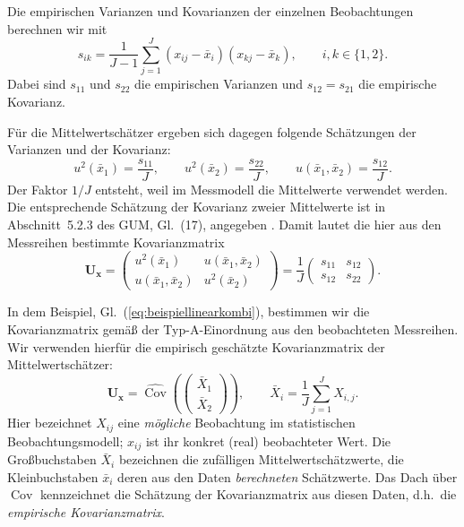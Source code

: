 Die empirischen Varianzen und Kovarianzen der einzelnen
Beobachtungen berechnen wir mit
\begin{equation}
s_{i k}
=
\frac{1}{J-1}
\sum_{j=1}^{J}
(x_{ij}-\bar x_i)(x_{kj}-\bar x_k),
\qquad i,k\in\{1,2\}.
\end{equation}
Dabei sind $s_{1 1}$ und $s_{2 2}$ die empirischen Varianzen
und $s_{1 2}=s_{2 1}$ die empirische Kovarianz.

Für die Mittelwertschätzer ergeben sich dagegen folgende
Schätzungen der Varianzen und der Kovarianz:
\begin{equation}
u^2(\bar x_1)=\frac{s_{1 1}}{J},
\qquad
u^2(\bar x_2)=\frac{s_{2 2}}{J},
\qquad
u(\bar x_1,\bar x_2)=\frac{s_{1 2}}{J}.
\end{equation}
Der Faktor $1/J$ entsteht, weil im Messmodell die Mittelwerte
verwendet werden.
Die entsprechende Schätzung der Kovarianz zweier Mittelwerte
ist in Abschnitt~5.2.3 des GUM, Gl.~(17), angegeben
\cite{GUM95}. Damit lautet die hier aus den Messreihen
bestimmte Kovarianzmatrix
\begin{equation}
\boxed{
\mathbf U_{\mathbf x}
=
\begin{pmatrix}
u^2(\bar x_1)&u(\bar x_1,\bar x_2)\\
u(\bar x_1,\bar x_2)&u^2(\bar x_2)
\end{pmatrix}
=
\frac{1}{J}
\begin{pmatrix}
s_{1 1}&s_{1 2}\\
s_{1 2}&s_{2 2}
\end{pmatrix}.
}
\end{equation}

In dem Beispiel, Gl.\ (\ref{eq:beispiellinearkombi}), bestimmen wir die Kovarianzmatrix
gemäß der Typ-A-Einordnung aus den beobachteten Messreihen.
Wir verwenden hierfür die empirisch geschätzte Kovarianzmatrix
der Mittelwertschätzer:
\begin{equation}
\mathbf U_{\mathbf x}
=
\widehat{\operatorname{Cov}}
\left(
\begin{pmatrix}
\bar X_1\\
\bar X_2
\end{pmatrix}
\right),
\qquad
\bar X_i=\frac{1}{J}\sum_{j=1}^{J}X_{i,j}.
\end{equation}
Hier bezeichnet $X_{i j}$ eine \emph{mögliche} Beobachtung im
statistischen Beobachtungsmodell; $x_{i j}$ ist ihr konkret (real) beobachteter
Wert. Die Großbuchstaben $\bar X_i$ bezeichnen die zufälligen
Mittelwertschätzwerte, die Klein\-buch\-staben $\bar x_i$ deren aus
den Daten \emph{berechneten} Schätzwerte. Das Dach über
$\operatorname{Cov}$ kennzeichnet die Schätzung der
Kovarianzmatrix aus diesen Daten, d.h.\ die \textsl{empirische Kovarianzmatrix}.

